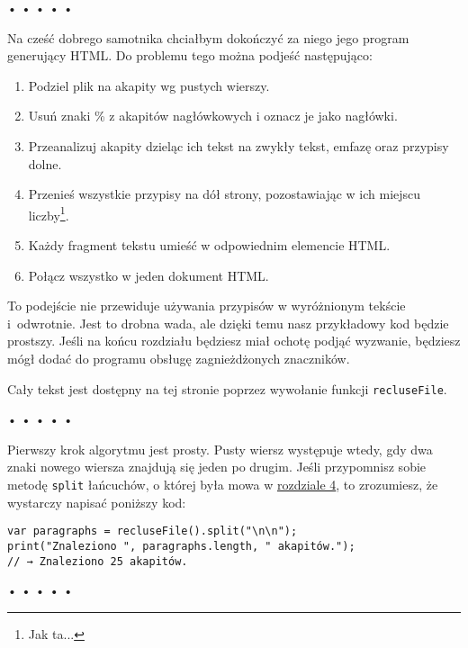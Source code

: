 \begin{center}
• • • • •
\end{center}

  
Na cześć dobrego samotnika chciałbym dokończyć za niego jego program generujący HTML. Do problemu tego można podjeść następująco:

  \begin{enumerate}
    \item Podziel plik na akapity wg pustych wierszy.
    \item Usuń znaki \% z akapitów nagłówkowych i oznacz je jako nagłówki.
    \item Przeanalizuj akapity dzieląc ich tekst na zwykły tekst, emfazę oraz przypisy dolne.
    \item Przenieś wszystkie przypisy na dół strony, pozostawiając w ich miejscu liczby\footnote{Jak ta...}.
    \item Każdy fragment tekstu umieść w odpowiednim elemencie HTML.
    \item Połącz wszystko w jeden dokument HTML.
  \end{enumerate}
  
To podejście nie przewiduje używania przypisów w wyróżnionym tekście i~odwrotnie. Jest to drobna wada, ale dzięki temu nasz przykładowy kod będzie prostszy. Jeśli na końcu rozdziału będziesz miał ochotę podjąć wyzwanie, będziesz mógł dodać do programu obsługę zagnieżdżonych znaczników.

  
Cały tekst jest dostępny na tej stronie poprzez wywołanie funkcji \texttt{recluseFile}.



\begin{center}
• • • • •
\end{center}

  
Pierwszy krok algorytmu jest prosty. Pusty wiersz występuje wtedy, gdy dwa znaki nowego wiersza znajdują się jeden po drugim. Jeśli przypomnisz sobie metodę \texttt{split} łańcuchów, o której była mowa w \hyperref[chap:4]{rozdziale 4}, to zrozumiesz, że wystarczy napisać poniższy kod:

  
\begin{verbatim} 
var paragraphs = recluseFile().split("\n\n");
print("Znaleziono ", paragraphs.length, " akapitów.");
// → Znaleziono 25 akapitów.
\end{verbatim}


\begin{center}
• • • • •
\end{center}

